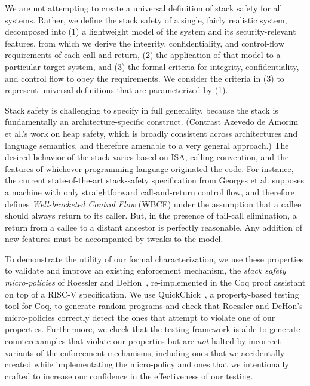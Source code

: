 We are not attempting to create a universal definition of stack safety for all systems.
Rather, we define the stack safety of a single, fairly realistic system, decomposed into
(1) a lightweight model of the system and its security-relevant features, from which we
derive the integrity, confidentiality, and control-flow requirements of each call and
return, (2) the application of that model to a particular target system, and (3)
the formal criteria for integrity, confidentiality, and control flow
to obey the requirements. We consider the criteria in (3) to represent universal definitions
that are parameterized by (1).
%

Stack safety is challenging to specify in full generality, because the stack is fundamentally
an architecture-specific construct. (Contrast Azevedo de Amorim et al.'s \cite{DBLP:conf/post/AmorimHP18} work on heap safety,
which is broadly consistent across architectures and language semantics, and therefore amenable
to a very general approach.)
The desired behavior of the stack varies based on ISA, calling convention,
and the features of whichever programming language originated the code.
%
%
For instance, the current state-of-the-art stack-safety specification from Georges et al.
\cite{Georges22:TempsDesCerises} supposes a machine with only straightforward call-and-return
control flow, and therefore defines {\it Well-bracketed Control Flow} (WBCF) under the assumption that
a callee should always return to its caller. But, in the presence of tail-call elimination, a
return from a callee to a distant ancestor is perfectly reasonable. Any addition of new features
must be accompanied by tweaks to the model.
%

To demonstrate the utility of our formal characterization, we use these
properties to validate and improve an existing enforcement mechanism, the
{\em stack safety micro-policies} of Roessler and DeHon~\cite{DBLP:conf/sp/RoesslerD18}, re-implemented
in the Coq proof assistant on top of a  RISC-V specification.  We
use QuickChick~\cite{Denes:VSL2014,Pierce:SF4}, a property-based testing
tool for Coq, to generate random programs and check
that Roessler and DeHon's micro-policies correctly detect the ones that
attempt to violate one of our properties. Furthermore, we
check that the testing framework is able to generate counterexamples
that violate our properties but are \emph{not} halted by incorrect
variants of the enforcement mechanisms, including ones that we accidentally created
while implementating the micro-policy and ones that we
intentionally crafted to increase our confidence in the effectiveness
of our testing.
%

